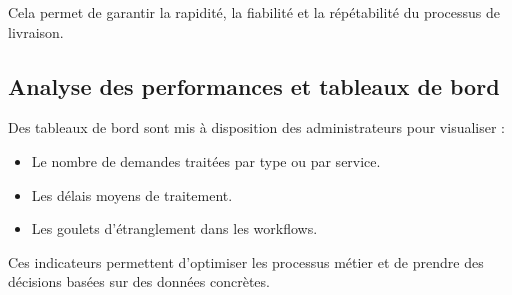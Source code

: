 Cela permet de garantir la rapidité, la fiabilité et la répétabilité du processus de livraison.

\subsection*{Analyse des performances et tableaux de bord}

Des tableaux de bord sont mis à disposition des administrateurs pour visualiser :
\begin{itemize}
    \item Le nombre de demandes traitées par type ou par service.
    \item Les délais moyens de traitement.
    \item Les goulets d’étranglement dans les workflows.
\end{itemize}

Ces indicateurs permettent d’optimiser les processus métier et de prendre des décisions basées sur des données concrètes.


\newpage
